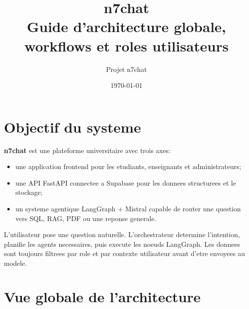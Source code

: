 \documentclass[11pt,a4paper]{article}
\title{
  \vspace{-1.2cm}
  \textbf{\Huge n7chat}\\
  \Large Guide d'architecture globale, workflows et roles utilisateurs
}
\author{Projet n7chat}
\date{\today}
\begin{document}
\maketitle
\tableofcontents
\newpage

\section{Objectif du systeme}

\textbf{n7chat} est une plateforme universitaire avec trois axes:

\begin{itemize}[leftmargin=1.2cm]
  \item une application frontend pour les etudiants, enseignants et administrateurs;
  \item une API FastAPI connectee a Supabase pour les donnees structurees et le stockage;
  \item un systeme agentique LangGraph + Mistral capable de router une question vers SQL, RAG, PDF ou une reponse generale.
\end{itemize}

\begin{tcolorbox}[colback=n7blue!5,colframe=n7blue,title=Principe central]
L'utilisateur pose une question naturelle. L'orchestrateur determine l'intention, planifie les agents necessaires, puis execute les noeuds LangGraph. Les donnees sont toujours filtrees par role et par contexte utilisateur avant d'etre envoyees au modele.
\end{tcolorbox}

\section{Vue globale de l'architecture}
\end{document}
